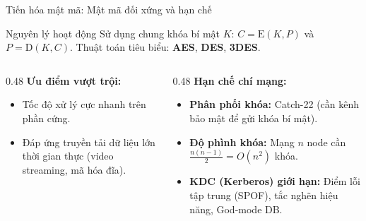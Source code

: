 \documentclass[10pt, aspectratio=169]{beamer}
\begin{document}
\begin{frame}{Tiến hóa mật mã: Mật mã đối xứng và hạn chế}
    \begin{block}{Nguyên lý hoạt động}
        Sử dụng chung khóa bí mật $K$: $C = \mathrm{E}(K, P)$ và $P = \mathrm{D}(K, C)$. Thuật toán tiêu biểu: \textbf{AES}, \textbf{DES}, \textbf{3DES}.
    \end{block}
    \begin{columns}[onlytextwidth]
        \begin{column}{0.48\textwidth}
            \textbf{Ưu điểm vượt trội:}
            \begin{itemize}
                \item Tốc độ xử lý cực nhanh trên phần cứng.
                \item Đáp ứng truyền tải dữ liệu lớn thời gian thực (video streaming, mã hóa đĩa).
            \end{itemize}
        \end{column}
        \begin{column}{0.48\textwidth}
            \textbf{Hạn chế chí mạng:}
            \begin{itemize}
                \item \textbf{Phân phối khóa:} Catch-22 (cần kênh bảo mật để gửi khóa bí mật).
                \item \textbf{Độ phình khóa:} Mạng $n$ node cần $\frac{n(n-1)}{2} = O(n^2)$ khóa.
                \item \textbf{KDC (Kerberos) giới hạn:} Điểm lỗi tập trung (SPOF), tắc nghẽn hiệu năng, God-mode DB.
            \end{itemize}
        \end{column}
    \end{columns}
\end{frame}
\end{document}

